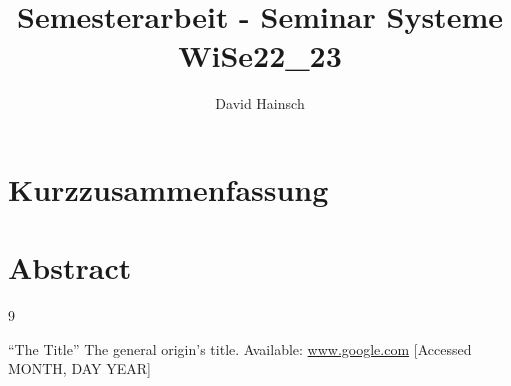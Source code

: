 \documentclass[
    paper = a4,
    fontsize = 12pt,
    headinclude = true,
    open = right,
    twoside = true,
    BCOR = 10mm,
    toc = listofnumbered,
    numbers = noendperiod,
    ]{report}
\title{Semesterarbeit - Seminar Systeme WiSe22_23}
\author{David Hainsch}
\date{\currenttime}
\begin{document}
        

        \section*{Kurzzusammenfassung}
        
        \section*{Abstract}
        

        \clearpage

        \tableofcontents
        \clearpage

        

        

        

        

        
        \clearpage
        \printglossaries
        \printglossary[type=\acronymtype,title=Abkürzungsverzeichnis,toctitle=Abkürzungsverzeichnis]

        \printglossary[title=Glossar,toctitle=Glossar]
        \clearpage

    \begin{thebibliography}{9}

     ``The Title'' The general origin's title. Available: \url{www.google.com} [Accessed MONTH, DAY YEAR]

    \end{thebibliography}
\end{document}
